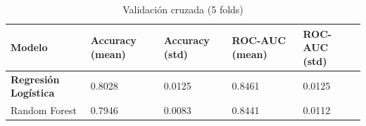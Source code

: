
\begin{table}[h]
    \centering
    \caption{Validación cruzada (5 folds)}
    \begin{tabular}{L{4cm}|C{2.2cm}|C{2.0cm}|C{2.2cm}|C{2.0cm}}
        \toprule
        \textbf{Modelo} & \textbf{Accuracy (mean)} & \textbf{Accuracy (std)} & \textbf{ROC-AUC (mean)} & \textbf{ROC-AUC (std)} \\
        \midrule
        \textbf{Regresión Logística} & 0.8028 & 0.0125 & 0.8461 & 0.0125 \\
        Random Forest & 0.7946 & 0.0083 & 0.8441 & 0.0112 \\
        \bottomrule
    \end{tabular}
\end{table}